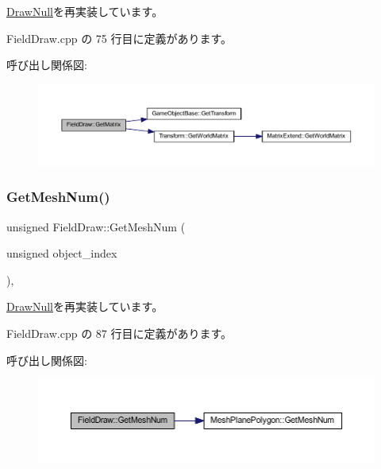 \mbox{\hyperlink{class_draw_null_adede079e9c11a756090740b20bb43022}{Draw\+Null}}を再実装しています。



 Field\+Draw.\+cpp の 75 行目に定義があります。

呼び出し関係図\+:\nopagebreak
\begin{figure}[H]
\begin{center}
\leavevmode
\includegraphics[width=350pt]{class_field_draw_a2629b4c4cd8e240e39c65b879c6e82b6_cgraph}
\end{center}
\end{figure}
\mbox{\label{class_field_draw_aeb54d8cba559ef615ee46c8a7bbd3b9f}} 
\subsubsection{\texorpdfstring{Get\+Mesh\+Num()}{GetMeshNum()}}
{\footnotesize\ttfamily unsigned Field\+Draw\+::\+Get\+Mesh\+Num (\begin{DoxyParamCaption}\item[{unsigned}]{object\+\_\+index }\end{DoxyParamCaption})\hspace{0.3cm}{\ttfamily [override]}, {\ttfamily [virtual]}}



\mbox{\hyperlink{class_draw_null_ad735978a85a5f3583eecd82d6bfe6413}{Draw\+Null}}を再実装しています。



 Field\+Draw.\+cpp の 87 行目に定義があります。

呼び出し関係図\+:\nopagebreak
\begin{figure}[H]
\begin{center}
\leavevmode
\includegraphics[width=350pt]{class_field_draw_aeb54d8cba559ef615ee46c8a7bbd3b9f_cgraph}
\end{center}
\end{figure}
\mbox{\label{class_field_draw_a4287d2ce33033b2413c1d3a81b173373}} 
